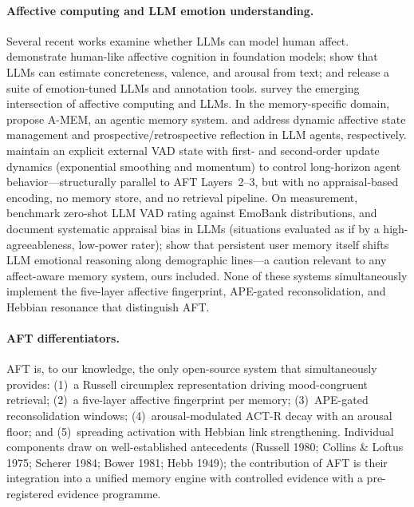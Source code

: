 \documentclass[11pt]{article}
\begin{document}
\paragraph{Affective computing and LLM emotion understanding.}
Several recent works examine whether LLMs can model human affect.
\citet{gandhi2024humanlike} demonstrate human-like affective cognition in
foundation models; \citet{martinez2024llmvalence} show that LLMs can estimate
concreteness, valence, and arousal from text; and \citet{liu2024emollms} release
a suite of emotion-tuned LLMs and annotation tools.
\citet{zhang2024affective} survey the emerging intersection of affective computing
and LLMs. In the memory-specific domain, \citet{xu2025amem} propose A-MEM, an
agentic memory system. \citet{damllm2025} and \citet{tan2025prospective}
address dynamic affective state management and prospective/retrospective reflection
in LLM agents, respectively.
\citet{subaharan2026dynamics} maintain an explicit external VAD state with first-
and second-order update dynamics (exponential smoothing and momentum) to control
long-horizon agent behavior---structurally parallel to AFT Layers~2--3, but with
no appraisal-based encoding, no memory store, and no retrieval pipeline.
On measurement, \citet{inoshita2026labels} benchmark zero-shot LLM VAD rating
against EmoBank distributions, and \citet{tak2025aware} document systematic
appraisal bias in LLMs (situations evaluated as if by a high-agreeableness,
low-power rater); \citet{fang2025personalization} show that persistent user
memory itself shifts LLM emotional reasoning along demographic lines---a caution
relevant to any affect-aware memory system, ours included.
None of these systems simultaneously implement the
five-layer affective fingerprint, APE-gated reconsolidation, and Hebbian resonance
that distinguish AFT.

\paragraph{AFT differentiators.}
AFT is, to our knowledge, the only open-source system that simultaneously
provides: (1)~a Russell circumplex representation driving mood-congruent
retrieval; (2)~a five-layer affective fingerprint per memory; (3)~APE-gated
reconsolidation windows; (4)~arousal-modulated ACT-R decay with an arousal
floor; and (5)~spreading activation with Hebbian link strengthening.
Individual components draw on well-established antecedents (Russell 1980;
Collins \& Loftus 1975; Scherer 1984; Bower 1981; Hebb 1949); the contribution
of AFT is their integration into a unified memory engine with controlled evidence
with a pre-registered evidence programme.
\end{document}
